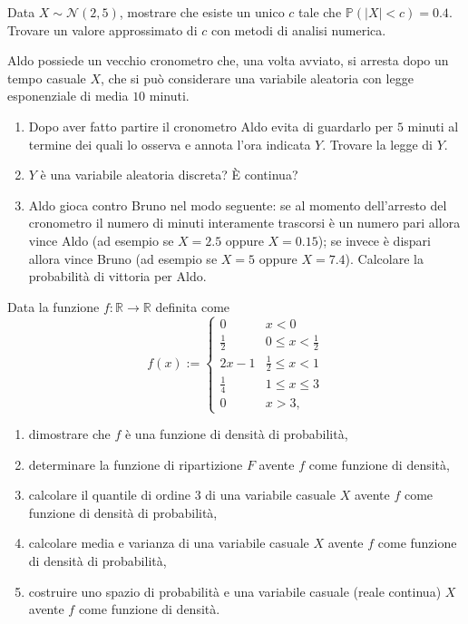 Data $X\sim \mathcal{N}( 2,5)$, mostrare che esiste un unico $c$ tale che $\mathbb{P}(| X| < c) =0.4$. Trovare un valore approssimato di $c$ con metodi di analisi numerica.
\Esercizio{}

Aldo possiede un vecchio cronometro che, una volta avviato, si arresta dopo un tempo casuale $X$, che si può considerare una variabile aleatoria con legge esponenziale di media $10$ minuti.
\begin{enumerate}
\item Dopo aver fatto partire il cronometro Aldo evita di guardarlo per $5$ minuti al termine dei quali lo osserva e annota l'ora indicata $Y$. Trovare la legge di $Y$.
\item $Y$ è una variabile aleatoria discreta? È continua?
\item Aldo gioca contro Bruno nel modo seguente: se al momento dell'arresto del cronometro il numero di minuti interamente trascorsi è un numero pari allora vince Aldo (ad esempio se $X=2.5$ oppure $X=0.15$); se invece è dispari allora vince Bruno (ad esempio se $X=5$ oppure $X=7.4$). Calcolare la probabilità di vittoria per Aldo.
\end{enumerate}
\Esercizio{}

Data la funzione $f:\mathbb{R}\rightarrow \mathbb{R}$ definita come
\begin{equation*}
f( x) :=\begin{cases}
0 & x< 0\\
\frac{1}{2} & 0\leq x< \frac{1}{2}\\
2x-1 & \frac{1}{2} \leq x< 1\\
\frac{1}{4} & 1\leq x\leq 3\\
0 & x >3,
\end{cases}
\end{equation*}
\begin{enumerate}
\item dimostrare che $f$ è una funzione di densità di probabilità,
\item determinare la funzione di ripartizione $F$ avente $f$ come funzione di densità,
\item calcolare il quantile di ordine $3$ di una variabile casuale $X$ avente $f$ come funzione di densità di probabilità,
\item calcolare media e varianza di una variabile casuale $X$ avente $f$ come funzione di densità di probabilità,
\item costruire uno spazio di probabilità e una variabile casuale (reale continua) $X$ avente $f$ come funzione di densità.
\end{enumerate}


\ParteSoluzioni